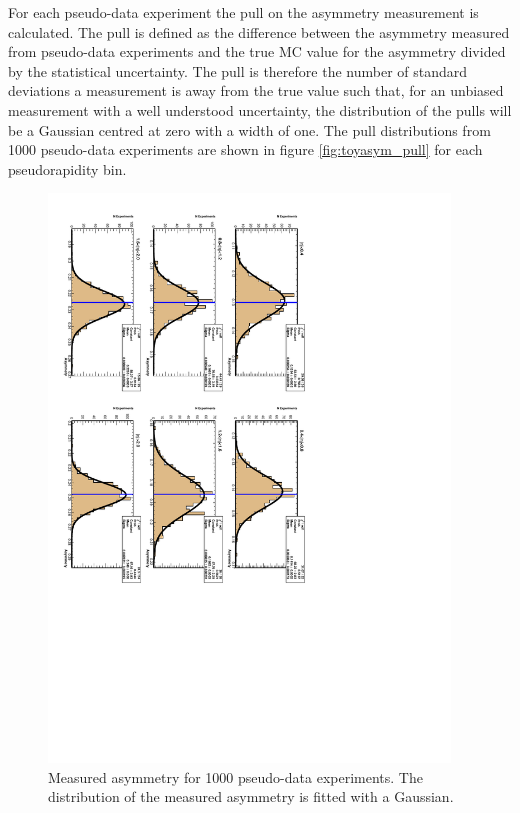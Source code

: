 For each pseudo-data experiment the pull on the asymmetry measurement is
calculated. The pull is defined as the difference between the asymmetry measured
from pseudo-data experiments and the true MC value for the asymmetry divided by
the statistical uncertainty. The pull is therefore the number of standard
deviations a measurement is away from the true value such that, for an unbiased
measurement with a well understood uncertainty, the distribution of the pulls
will be a Gaussian centred at zero with a width of one.
The pull distributions from 1000 pseudo-data experiments are shown in figure
\ref{fig:toyasym_pull} for each pseudorapidity bin.

\begin{figure}[htbp]
  \begin{center}
    \includegraphics*[angle=90,width=0.95\textwidth]{toyasym.pdf}
    \caption{\label{fig:toyasym}Measured asymmetry for 1000 pseudo-data experiments. The distribution of the measured asymmetry is fitted with a Gaussian.}
  \end{center}
\end{figure}

